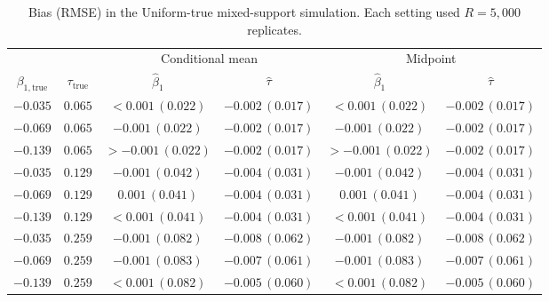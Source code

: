 \documentclass[11pt]{article}
\begin{document}
\begin{table}[htbp]
\centering
\caption{Bias (RMSE) in the Uniform-true mixed-support simulation. Each setting used $R=5{,}000$ replicates.}
\begin{tabular}{cc cc cc}
\toprule
& & \multicolumn{2}{c}{Conditional mean} & \multicolumn{2}{c}{Midpoint} \\
\cmidrule(lr){3-4}\cmidrule(lr){5-6}
$\beta_{1,\mathrm{true}}$ & $\tau_{\mathrm{true}}$ & $\hat\beta_1$ & $\hat\tau$ & $\hat\beta_1$ & $\hat\tau$ \\
\midrule
$-0.035$ & $0.065$ & $<0.001\,(0.022)$ & $-0.002\,(0.017)$ & $<0.001\,(0.022)$ & $-0.002\,(0.017)$ \\
$-0.069$ & $0.065$ & $-0.001\,(0.022)$ & $-0.002\,(0.017)$ & $-0.001\,(0.022)$ & $-0.002\,(0.017)$ \\
$-0.139$ & $0.065$ & $>-0.001\,(0.022)$ & $-0.002\,(0.017)$ & $>-0.001\,(0.022)$ & $-0.002\,(0.017)$ \\
$-0.035$ & $0.129$ & $-0.001\,(0.042)$ & $-0.004\,(0.031)$ & $-0.001\,(0.042)$ & $-0.004\,(0.031)$ \\
$-0.069$ & $0.129$ & $0.001\,(0.041)$ & $-0.004\,(0.031)$ & $0.001\,(0.041)$ & $-0.004\,(0.031)$ \\
$-0.139$ & $0.129$ & $<0.001\,(0.041)$ & $-0.004\,(0.031)$ & $<0.001\,(0.041)$ & $-0.004\,(0.031)$ \\
$-0.035$ & $0.259$ & $-0.001\,(0.082)$ & $-0.008\,(0.062)$ & $-0.001\,(0.082)$ & $-0.008\,(0.062)$ \\
$-0.069$ & $0.259$ & $-0.001\,(0.083)$ & $-0.007\,(0.061)$ & $-0.001\,(0.083)$ & $-0.007\,(0.061)$ \\
$-0.139$ & $0.259$ & $<0.001\,(0.082)$ & $-0.005\,(0.060)$ & $<0.001\,(0.082)$ & $-0.005\,(0.060)$ \\
\bottomrule
\end{tabular}
\end{table}
\end{document}

